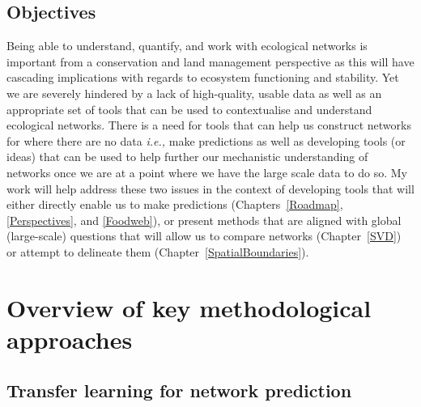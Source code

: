 \begin{refsection}
\subsection{Objectives}\label{objectives-and-hypotheses}

Being able to understand, quantify, and work with ecological networks is
important from a conservation and land management perspective as this
will have cascading implications with regards to ecosystem functioning
and stability. Yet we are severely hindered by a lack of high-quality,
usable data as well as an appropriate set of tools that can be used to
contextualise and understand ecological networks. There is a need for
tools that can help us construct networks for where there are no data
\emph{i.e.,} make predictions as well as developing tools (or ideas) that
can be used to help further our mechanistic understanding of networks once
we are at a point where we have the large scale data to do so. My work will
help address these two issues in the context of developing tools that will
either directly enable us to make predictions (Chapters~\ref{Roadmap},
\ref{Perspectives}, and \ref{Foodweb}), or present methods that are aligned
with global (large-scale) questions that will allow us to compare networks
(Chapter~\ref{SVD}) or attempt to delineate them 
(Chapter~\ref{SpatialBoundaries}).

\section{Overview of key methodological approaches}

\subsection{Transfer learning for network prediction}\label{transfer-learning-for-network-prediction}


\end{refsection}
